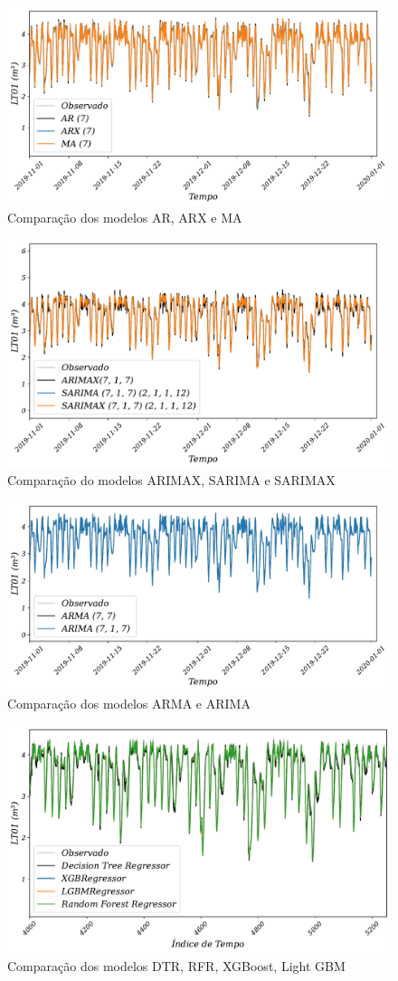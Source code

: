 \begin{figure}[!htb]
	\centering
	\caption{Comparação dos modelos AR, ARX e MA}
	\label{fig:1-ar-arx-ma}
	\includegraphics[width=0.6\linewidth]{Resultados/Figuras/1-AR-ARX-MA}
	
\end{figure}
\begin{figure}[!htb]
	\centering
	\caption{Comparação do modelos ARIMAX, SARIMA e SARIMAX}
	\label{fig:1-arimax-sarima-sarimax}
	\includegraphics[width=0.6\linewidth]{Resultados/Figuras/1-ARIMAX-SARIMA-SARIMAX}
	
\end{figure}
\begin{figure}[!htb]
	\centering
	\caption{Comparação dos modelos ARMA e ARIMA}
	\label{fig:1-arma-arima}
	\includegraphics[width=0.6\linewidth]{Resultados/Figuras/1-ARMA-ARIMA}
	
\end{figure}
\begin{figure}[!htb]
	\centering
	\caption{Comparação dos modelos DTR, RFR, XGBoost, Light GBM}
	\label{fig:lr-xgb-lgbm-rf}
	\includegraphics[width=0.6\linewidth]{Resultados/Figuras/LR-XGB-LGBM-RF}
	
\end{figure}
